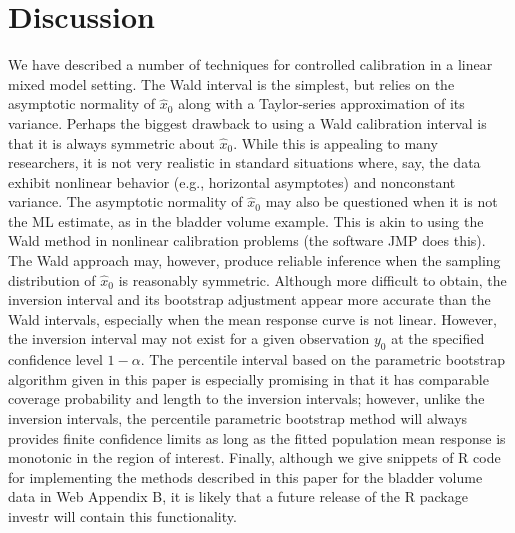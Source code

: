 \documentclass[useAMS,usenatbib,usegraphicx,referee]{biom}\usepackage[]{graphicx}\usepackage[]{color}
\newcommand{\proglang}[1]{\textsf{#1}}
\newcommand{\pkg}[1]{{\fontseries{b}\selectfont #1}}
\begin{document}
\section{Discussion}
\label{sec:discuss}
We have described a number of techniques for controlled calibration in a linear mixed model setting. The Wald interval is the simplest, but relies on the asymptotic normality of $\widehat{x}_0$ along with a Taylor-series approximation of its variance. Perhaps the biggest drawback to using a Wald calibration interval is that it is always symmetric about $\widehat{x}_0$. While this is appealing to many researchers, it is not very realistic in standard situations where, say, the data exhibit nonlinear behavior (e.g., horizontal asymptotes) and nonconstant variance. The asymptotic normality of $\widehat{x}_0$ may also be questioned when it is not the ML estimate, as in the bladder volume example. This is akin to using the Wald method in nonlinear calibration problems (the software JMP does this). The Wald approach may, however, produce reliable inference when the sampling distribution of $\widehat{x}_0$ is reasonably symmetric. Although more difficult to obtain, the inversion interval and its bootstrap adjustment appear more accurate than the Wald intervals, especially when the mean response curve is not linear. However, the inversion interval may not exist for a given observation $y_0$ at the specified confidence level $1-\alpha$. The percentile interval based on the parametric bootstrap algorithm given in this paper is especially promising in that it has comparable coverage probability and length to the inversion intervals; however, unlike the inversion intervals, the percentile parametric bootstrap method will always provides finite confidence limits as long as the fitted population mean response is monotonic in the region of interest. Finally, although we give snippets of \proglang{R} code for implementing the methods described in this paper for the bladder volume data in Web Appendix B, it is likely that a future release of the \proglang{R} package \pkg{investr} \citep{investr_greenwell_2013} will contain this functionality.


\backmatter
\end{document}
